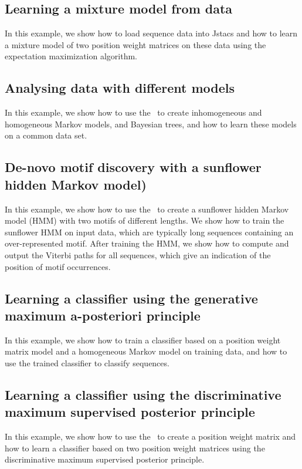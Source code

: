 \subsection{Learning a mixture model from data}
In this example, we show how to load sequence data into Jstacs and how to learn a mixture model of two position weight matrices on these data using the expectation maximization algorithm.
\renewcommand{\codefile}{./recipes/CreateMixtureModel.java}
\setcounter{off}{35}

\subsection{Analysing data with different models}
In this example, we show how to use the \TrainSMFactory~to create inhomogeneous and homogeneous Markov models, and Bayesian trees, and how to learn these models on a common data set.
\renewcommand{\codefile}{./recipes/AnalyseDataWithDifferentModels.java}
\setcounter{off}{35}

\subsection{De-novo motif discovery with a sunflower hidden Markov model)}
In this example, we show how to use the \HMMFactory~to create a sunflower hidden Markov model (HMM) with two motifs of different lengths. We show how to train the sunflower HMM on input data, which are typically long sequences containing an over-represented motif. After training the HMM, we show how to compute and output the Viterbi paths for all sequences, which give an indication of the position of motif occurrences.
\renewcommand{\codefile}{./recipes/DeNovoSunflower.java}
\setcounter{off}{40}

\subsection{Learning a classifier using the generative maximum a-posteriori principle}
In this example, we show how to train a classifier based on a position weight matrix model and a homogeneous Markov model on training data, and how to use the trained classifier to classify sequences.
\renewcommand{\codefile}{./recipes/TrainClassifier.java}
\setcounter{off}{40}

\subsection{Learning a classifier using the discriminative maximum supervised posterior principle}
In this example, we show how to use the \DiffSMFactory~to create a position weight matrix and how to learn a classifier based on two position weight matrices using the discriminative maximum supervised posterior principle.
\renewcommand{\codefile}{./recipes/CreateMSPClassifier.java}
\setcounter{off}{42}

